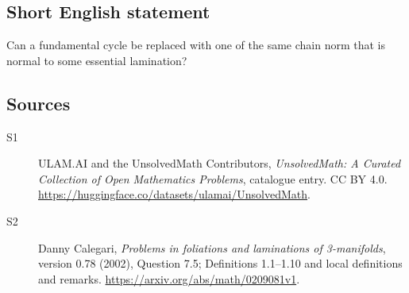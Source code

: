 \documentclass[11pt]{article}
\begin{document}
\subsection{Short English statement}
Can a fundamental cycle be replaced with one of the same chain norm that is normal to some essential lamination?
\subsection{Sources}
\begin{description}
\item[\hypertarget{source:statement:1}{S1}] ULAM.AI and the UnsolvedMath Contributors, \emph{UnsolvedMath: A Curated Collection of Open Mathematics Problems}, catalogue entry. CC BY 4.0. \url{https://huggingface.co/datasets/ulamai/UnsolvedMath}.
\item[\hypertarget{source:statement:2}{S2}] Danny Calegari, \emph{Problems in foliations and laminations of 3-manifolds}, version 0.78 (2002), Question 7.5; Definitions 1.1--1.10 and local definitions and remarks. \url{https://arxiv.org/abs/math/0209081v1}.
\end{description}
\label{end:statement}
\end{document}
